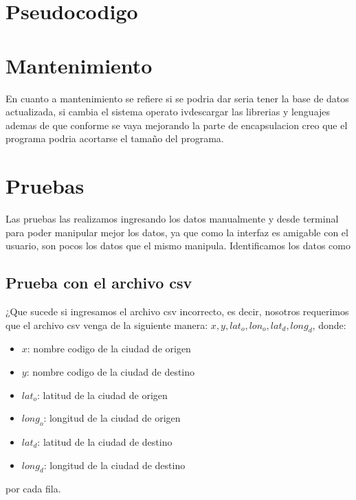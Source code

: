 \documentclass[12pt]{article}
\begin{document}
\section{Pseudocodigo}
\begin{algorithmic}[1]
  \EndIf
  \EndIf
  \EndFor
  \EndFor

  \EndIf
  \Else
  \EndIf
  \EndFunction
\end{algorithmic}
\section{Mantenimiento}
En cuanto a mantenimiento se refiere si se podria dar seria tener la base de datos actualizada, si cambia el sistema operato ivdescargar las librerias y lenguajes ademas de que conforme se vaya mejorando la parte de encapsulacion creo que el programa podria acortarse el tamaño del programa.
\section{Pruebas}
Las pruebas las realizamos ingresando los datos manualmente y desde terminal para poder manipular mejor los datos, ya que como la interfaz es amigable con el usuario, son pocos los datos que el mismo manipula. Identificamos los datos como 
\subsection{Prueba con el archivo csv}
¿Que sucede si ingresamos el archivo csv incorrecto, es decir, nosotros requerimos que el archivo csv venga de la siguiente manera: $x,y,lat_o,lon_o,lat_d, long_d$, donde:
\begin{itemize}
\item $x$: nombre codigo de la ciudad de origen
\item $y$: nombre codigo de la ciudad de destino
\item $lat_o$: latitud de la ciudad de origen
\item $long_o$: longitud de la ciudad de origen
\item $lat_d$: latitud de la ciudad de destino
\item $long_d$: longitud de la ciudad de destino
\end{itemize}
por cada fila.
\end{document}
